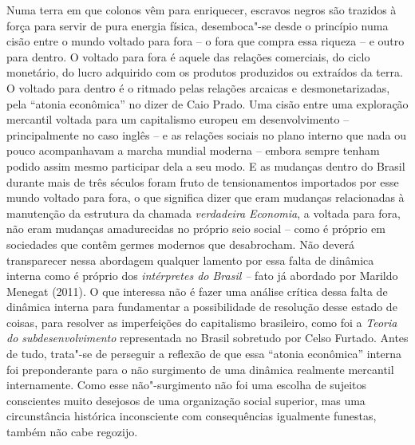 Numa terra em que colonos vêm para enriquecer, escravos negros são
trazidos à força para servir de pura energia física, desemboca"-se desde
o princípio numa cisão entre o mundo voltado para fora -- o fora que
compra essa riqueza -- e outro para dentro. O voltado para fora é aquele
das relações comerciais, do ciclo monetário, do lucro adquirido com os
produtos produzidos ou extraídos da terra. O voltado para dentro é o
ritmado pelas relações arcaicas e desmonetarizadas, pela ``atonia
econômica'' no dizer de Caio Prado. Uma cisão entre uma exploração
mercantil voltada para um capitalismo europeu em desenvolvimento --
principalmente no caso inglês -- e as relações sociais no plano interno
que nada ou pouco acompanhavam a marcha mundial moderna -- embora sempre
tenham podido assim mesmo participar dela a seu modo. E as mudanças
dentro do Brasil durante mais de três séculos foram fruto de
tensionamentos importados por esse mundo voltado para fora, o que
significa dizer que eram mudanças relacionadas à manutenção da estrutura
da chamada \emph{verdadeira} \emph{Economia}, a voltada para fora, não
eram mudanças amadurecidas no próprio seio social -- como é próprio em
sociedades que contêm germes modernos que desabrocham. Não deverá
transparecer nessa abordagem qualquer lamento por essa falta de dinâmica
interna como é próprio dos \emph{intérpretes do Brasil --} fato já
abordado por Marildo Menegat (2011). O que interessa não é fazer uma
análise crítica dessa falta de dinâmica interna para fundamentar a
possibilidade de resolução desse estado de coisas, para resolver as
imperfeições do capitalismo brasileiro, como foi a \emph{Teoria do
subdesenvolvimento} representada no Brasil sobretudo por Celso Furtado.
Antes de tudo, trata"-se de perseguir a reflexão de que essa ``atonia
econômica'' interna foi preponderante para o não surgimento de uma
dinâmica realmente mercantil internamente. Como esse não"-surgimento não
foi uma escolha de sujeitos conscientes muito desejosos de uma
organização social superior, mas uma circunstância histórica
inconsciente com consequências igualmente funestas, também não cabe
regozijo.

